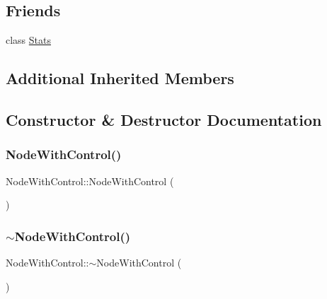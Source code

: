 \subsection*{Friends}
\begin{DoxyCompactItemize}
\item 
class \hyperlink{classNodeWithControl_a129f65b6976377739eb6231b6962985e}{Stats}
\end{DoxyCompactItemize}
\subsection*{Additional Inherited Members}


\subsection{Constructor \& Destructor Documentation}
\mbox{\label{classNodeWithControl_ab0a223aca65e289aaee682dadfbefb5c}} 
\subsubsection{\texorpdfstring{Node\+With\+Control()}{NodeWithControl()}}
{\footnotesize\ttfamily Node\+With\+Control\+::\+Node\+With\+Control (\begin{DoxyParamCaption}{ }\end{DoxyParamCaption})}

\mbox{\label{classNodeWithControl_a6e752e38f0e233e7debfaaf4ae26fb2d}} 
\subsubsection{\texorpdfstring{$\sim$\+Node\+With\+Control()}{~NodeWithControl()}}
{\footnotesize\ttfamily Node\+With\+Control\+::$\sim$\+Node\+With\+Control (\begin{DoxyParamCaption}{ }\end{DoxyParamCaption})\hspace{0.3cm}{\ttfamily [virtual]}}



